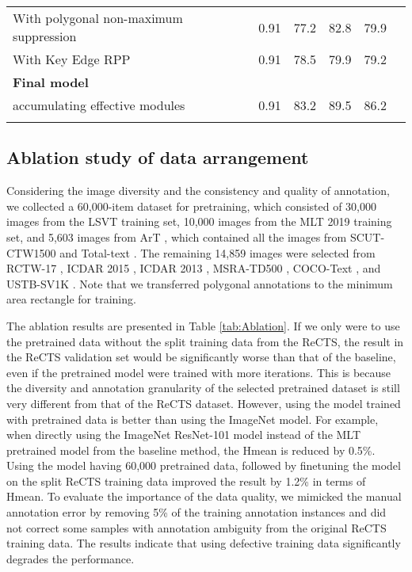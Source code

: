 \begin{table*}
\begin{tabular}{lccccc}
  \hspace{5mm} With polygonal non-maximum suppression & 0.91 & 77.2 & 82.8 & 79.9 & \bf \color{red}{$\uparrow$ 0.8} \\
  \hspace{5mm} With Key Edge RPP & 0.91 & 78.5 & 79.9 & 79.2 & \bf \color{red}{$\uparrow$ 0.1} \\
\noalign{\smallskip}\hline
  {\bf Final model} \\
  \hspace{5mm} accumulating effective modules & 0.91 & 83.2 & 89.5 & 86.2 &  \bf \color{red}{$\uparrow$ 7.1} \\
  \noalign{\smallskip}\hline
  \end{tabular}
\end{table*}

\subsection{Ablation study of data arrangement}
Considering the image diversity and the consistency and quality of annotation, we collected a 60,000-item dataset for pretraining, which consisted of 30,000 images from the LSVT \cite{sun2019icdar} training set, 10,000 images from the MLT 2019 \cite{nayef2019icdar2019} training set, and 5,603 images from ArT \cite{chng2019icdar2019}, which contained all the images from SCUT-CTW1500 \cite{liu2019curved} and Total-text \cite{kheng2017total,ch2019total}. The remaining 14,859 images were selected from RCTW-17 \cite{shi2017icdar2017}, ICDAR 2015 \cite{karatzas2015icdar}, ICDAR 2013 \cite{Karatzas2013ICDAR}, MSRA-TD500 \cite{Yao2012Detecting}, COCO-Text \cite{veit2016coco}, and USTB-SV1K \cite{Yin2015Multi}. Note that we transferred polygonal annotations to the minimum area rectangle for training.


The ablation results are presented in Table \ref{tab:Ablation}. If we only were to use the pretrained data without the split training data from the ReCTS, the result in the ReCTS validation set would be significantly worse than that of the baseline, even if the pretrained model were trained with more iterations. This is because the diversity and annotation granularity of the selected pretrained dataset is still very different from that of the ReCTS dataset. However, using the model trained with pretrained data is better than using the ImageNet model. For example, when directly using the ImageNet ResNet-101 model instead of the MLT pretrained model from the baseline method, the Hmean is reduced by 0.5\%. Using the model having 60,000 pretrained data, followed by finetuning the model on the split ReCTS training data improved the result by 1.2\% in terms of Hmean. To evaluate the importance of the data quality, we mimicked the manual annotation error by removing 5\% of the training annotation instances and did not correct some samples with annotation ambiguity from the original ReCTS training data. The results indicate that using defective training data significantly degrades the performance.



